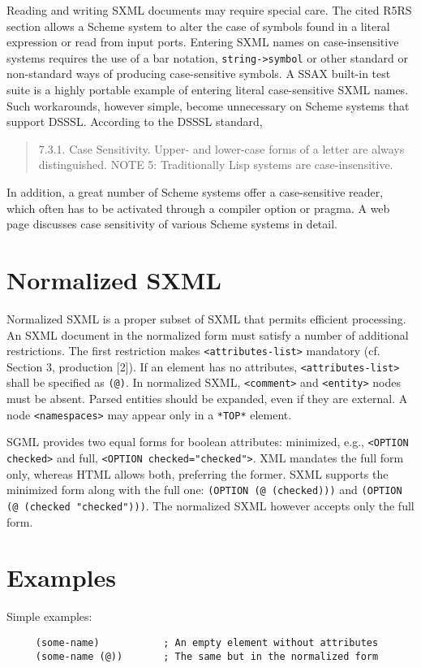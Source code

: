 \documentclass[10pt]{article}
\begin{document}
Reading and writing SXML documents may require special care. The cited R5RS section allows a Scheme system to alter the case of symbols found in a literal expression or read from input ports. Entering SXML names on case-insensitive systems requires the use of a bar notation, \texttt{string->symbol} or
other standard or non-standard ways of producing case-sensitive
symbols. A SSAX built-in test suite is a highly portable example of entering literal case-sensitive SXML names. Such workarounds, however simple, become unnecessary on Scheme systems that support DSSSL. According to the DSSSL standard,\begin{quote}
7.3.1. Case Sensitivity. Upper- and lower-case forms of a
letter are always distinguished. NOTE 5: Traditionally Lisp systems
are case-insensitive.\end{quote}
In addition, a great number of Scheme systems offer a
case-sensitive reader, which often has to be activated through a
compiler option or pragma. A web page \cite{Scheme-case-sensitivity} discusses case sensitivity of various Scheme systems in detail.

\section{Normalized SXML}
Normalized SXML is a proper subset of SXML that permits efficient
processing. An SXML document in the normalized form must satisfy a
number of additional restrictions. The first restriction makes
\texttt{<attributes-list>} mandatory (cf. Section 3,
production [2]). If an element has no attributes, \texttt{<attributes-list>} shall be specified as \texttt{(@)}. In normalized SXML,
\texttt{<comment>} and \texttt{<entity>} nodes
must be absent. Parsed entities should be expanded, even if they are external. 
A node \texttt{<namespaces>} may appear only in
a \texttt{*TOP*} element.

SGML provides two equal forms for boolean attributes: minimized, e.g., \texttt{<OPTION checked>} and full, \texttt{<OPTION checked="checked">}. XML mandates the full form only, whereas HTML allows both,
preferring the former. SXML supports the minimized form along with the
full one: \texttt{(OPTION (@ (checked)))} and \texttt{(OPTION (@ (checked "checked")))}. The normalized SXML however accepts only the full form.

\section{Examples}
Simple examples:\begin{verbatim}
     (some-name)           ; An empty element without attributes
     (some-name (@))       ; The same but in the normalized form
\end{verbatim}
\end{document}
